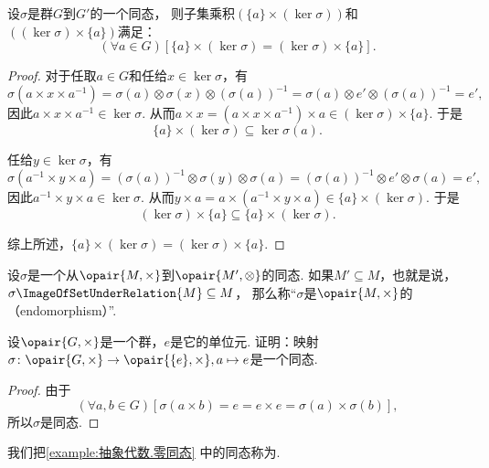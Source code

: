 \begin{proposition}
设\(\sigma\)是群\(G\)到\(G'\)的一个同态，
则子集乘积\((\{a\}\times(\ker\sigma))\)和\(((\ker\sigma)\times\{a\})\)满足：
\begin{equation*}
	(\forall a \in G)[\{a\}\times(\ker\sigma)=(\ker\sigma)\times\{a\}].
\end{equation*}
\begin{proof}
对于任取\(a\in G\)和任给\(x\in\ker\sigma\)，有\begin{equation*}
	\sigma(a \times x \times a^{-1})
	= \sigma(a) \otimes \sigma(x) \otimes (\sigma(a))^{-1}
	= \sigma(a) \otimes e' \otimes (\sigma(a))^{-1}
	= e',
\end{equation*}
因此\(a \times x \times a^{-1} \in \ker\sigma\).
从而\(a \times x
= (a \times x \times a^{-1}) \times a \in (\ker\sigma)\times\{a\}\).
于是\begin{equation*}
	\{a\}\times(\ker\sigma) \subseteq \ker\sigma(a).
\end{equation*}

任给\(y\in\ker\sigma\)，有\begin{equation*}
	\sigma(a^{-1} \times y \times a)
	= (\sigma(a))^{-1} \otimes \sigma(y) \otimes \sigma(a)
	= (\sigma(a))^{-1} \otimes e' \otimes \sigma(a)
	= e',
\end{equation*}
因此\(a^{-1} \times y \times a \in \ker\sigma\).
从而\(y \times a = a \times (a^{-1} \times y \times a) \in \{a\}\times(\ker\sigma)\).
于是\begin{equation*}
	(\ker\sigma)\times\{a\} \subseteq \{a\}\times(\ker\sigma).
\end{equation*}

综上所述，\(\{a\}\times(\ker\sigma)=(\ker\sigma)\times\{a\}\).
\end{proof}
\end{proposition}

\begin{definition}
设\(\sigma\)是一个从\(\opair{M,\times}\)到\(\opair{M',\otimes}\)的同态.
如果\(M' \subseteq M\)，也就是说，\(\sigma\ImageOfSetUnderRelation{M}\subseteq M\)，
那么称“\(\sigma\)是\(\opair{M,\times}\)的（endomorphism）”.
\end{definition}

\begin{example}\label{example:抽象代数.零同态}
设\(\opair{G,\times}\)是一个群，\(e\)是它的单位元.
证明：映射\(\sigma\colon\opair{G,\times}\to\opair{\{e\},\times},a\mapsto e\)是一个同态.
\begin{proof}
由于\begin{equation*}
	(\forall a,b\in G)[
		\sigma(a \times b)
		= e
		= e \times e
		= \sigma(a) \times \sigma(b)
	],
\end{equation*}
所以\(\sigma\)是同态.
\end{proof}
\end{example}
我们把\cref{example:抽象代数.零同态} 中的同态称为.

